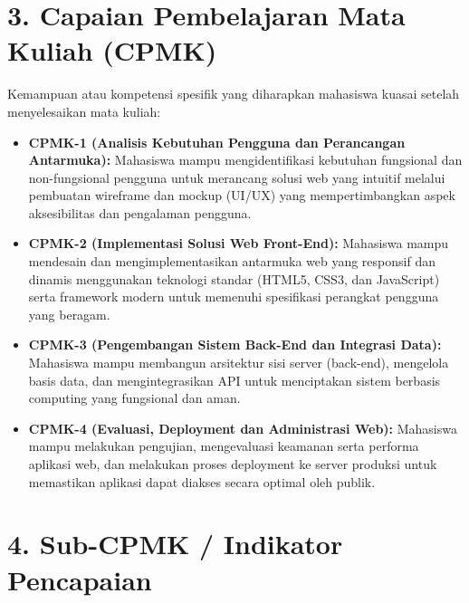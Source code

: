 \documentclass[12pt,a4paper]{article}
\begin{document}
\vspace{0.5cm}

\section*{3. Capaian Pembelajaran Mata Kuliah (CPMK)}

Kemampuan atau kompetensi spesifik yang diharapkan mahasiswa kuasai setelah menyelesaikan mata kuliah:

\begin{itemize}[leftmargin=*]
  \item \textbf{CPMK-1 (Analisis Kebutuhan Pengguna dan Perancangan Antarmuka):} Mahasiswa mampu mengidentifikasi kebutuhan fungsional dan non-fungsional pengguna untuk merancang solusi web yang intuitif melalui pembuatan wireframe dan mockup (UI/UX) yang mempertimbangkan aspek aksesibilitas dan pengalaman pengguna.
  \item \textbf{CPMK-2 (Implementasi Solusi Web Front-End):} Mahasiswa mampu mendesain dan mengimplementasikan antarmuka web yang responsif dan dinamis menggunakan teknologi standar (HTML5, CSS3, dan JavaScript) serta framework modern untuk memenuhi spesifikasi perangkat pengguna yang beragam.
  \item \textbf{CPMK-3 (Pengembangan Sistem Back-End dan Integrasi Data):} Mahasiswa mampu membangun arsitektur sisi server (back-end), mengelola basis data, dan mengintegrasikan API untuk menciptakan sistem berbasis computing yang fungsional dan aman.
  \item \textbf{CPMK-4 (Evaluasi, Deployment dan Administrasi Web):} Mahasiswa mampu melakukan pengujian, mengevaluasi keamanan serta performa aplikasi web, dan melakukan proses deployment ke server produksi untuk memastikan aplikasi dapat diakses secara optimal oleh publik.
\end{itemize}

\vspace{0.5cm}

\section*{4. Sub-CPMK / Indikator Pencapaian}
\end{document}
